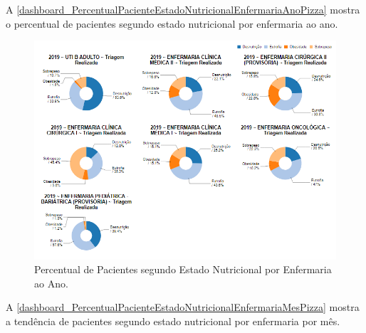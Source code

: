 \newpage
A \autoref{dashboard_PercentualPacienteEstadoNutricionalEnfermariaAnoPizza} mostra o percentual de pacientes segundo estado nutricional por enfermaria ao ano.

\begin{figure}[htb]
	\caption{\label{dashboard_PercentualPacienteEstadoNutricionalEnfermariaAnoPizza}Percentual de Pacientes segundo Estado Nutricional por Enfermaria ao Ano.}
	\begin{center}
	    \includegraphics[scale=0.6]{Imagens/3.3.PercentualPacienteEstadoNutricionalEnfermariaAnoPizza.png}
	\end{center}
\end{figure}

\newpage
A \autoref{dashboard_PercentualPacienteEstadoNutricionalEnfermariaMesPizza} mostra a tendência de pacientes segundo estado nutricional por enfermaria por mês.


